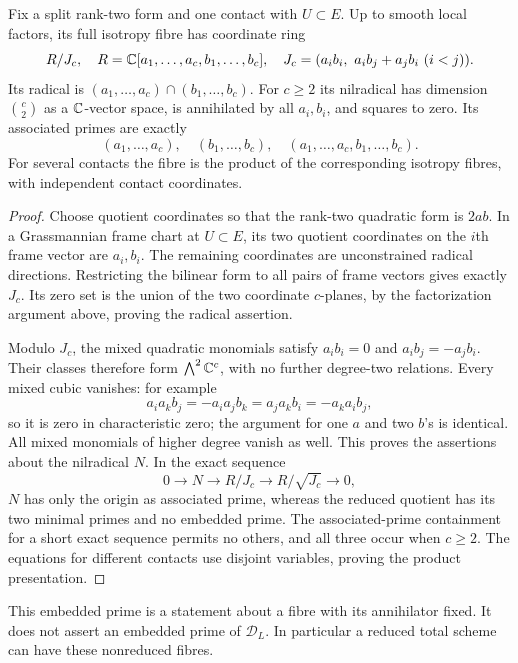 \begin{proposition}
\label{prop:rank-two-fibre}
Fix a split rank-two form and one contact with $U\subset E$.
Up to smooth local factors, its full isotropy fibre has coordinate ring
\begin{equation}\label{eq:rank-two-fibre-ring}
 R/J_c,\quad R=\mathbb C[a_1,\ldots,a_c,b_1,\ldots,b_c],\quad
 J_c=(a_i b_i,\ a_i b_j+a_j b_i\ (i<j)).
\end{equation}
Its radical is $(a_1,\ldots,a_c)\cap(b_1,\ldots,b_c)$.
For $c\ge2$ its nilradical has dimension $\binom c2$ as a
$\mathbb C$-vector space, is annihilated by all $a_i,b_i$, and squares to
zero. Its associated primes are exactly
\[
 (a_1,\ldots,a_c),\quad (b_1,\ldots,b_c),\quad
 (a_1,\ldots,a_c,b_1,\ldots,b_c).
\]
For several contacts the fibre is the product of the corresponding
isotropy fibres, with independent contact coordinates.
\end{proposition}
\begin{proof}
Choose quotient coordinates so that the rank-two quadratic form is
$2ab$. In a Grassmannian frame chart at $U\subset E$, its two quotient
coordinates on the $i$th frame vector are $a_i,b_i$. The remaining
coordinates are unconstrained radical directions. Restricting the
bilinear form to all pairs of frame vectors gives exactly $J_c$.
Its zero set is the union of the two coordinate $c$-planes, by the
factorization argument above, proving the radical assertion.

Modulo $J_c$, the mixed quadratic monomials satisfy
$a_i b_i=0$ and $a_i b_j=-a_j b_i$. Their classes therefore form
$\bigwedge^2\mathbb C^c$, with no further degree-two relations. Every mixed
cubic vanishes: for example
\[
 a_i a_k b_j=-a_i a_j b_k=a_j a_k b_i=-a_k a_i b_j,
\]
so it is zero in characteristic zero; the argument for one $a$ and two
$b$'s is identical. All mixed monomials of higher degree vanish as
well. This proves the assertions about the nilradical $N$.
In the exact sequence
\[
 0\longrightarrow N\longrightarrow R/J_c
 \longrightarrow R/\sqrt{J_c}\longrightarrow0,
\]
$N$ has only the origin as associated prime, whereas the reduced
quotient has its two minimal primes and no embedded prime.
The associated-prime containment for a short exact sequence permits
no others, and all three occur when $c\ge2$. The equations for
different contacts use disjoint variables, proving the product
presentation.
\end{proof}
This embedded prime is a statement about a fibre with its annihilator
fixed. It does not assert an embedded prime of $\mathscr D_L$.
In particular a reduced total scheme can have these nonreduced fibres.

